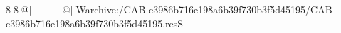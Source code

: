 8  8  @|                                                   @| W   archive:/CAB-c3986b716e198a6b39f730b3f5d45195/CAB-c3986b716e198a6b39f730b3f5d45195.resS 